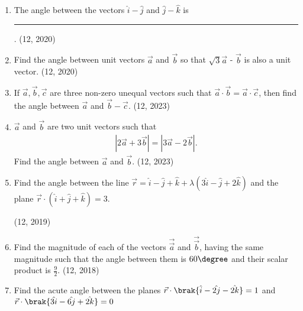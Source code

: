\begin{enumerate}[label=\thesubsection.\arabic*, ref=\thesubsection.\theenumi]
\item The angle between the vectors $\hat{i} - \hat{j}$ and $\hat{j} - \hat{k}$ is \rule{1cm}{0.2pt}.
\hfill (12, 2020)
\item Find the angle between unit vectors $\overrightarrow{a}$ and $\overrightarrow{b}$ so that $\sqrt{3}\overrightarrow{a}$ - $\overrightarrow{b}$ is also a unit vector.
\hfill (12, 2020)
    \item If $\overrightarrow{a}, \overrightarrow{b}, \overrightarrow{c}$ are three non-zero unequal vectors such that $\overrightarrow{a} \cdot \overrightarrow{b} = \overrightarrow{a} \cdot \overrightarrow{c}$, then find the angle between $\overrightarrow{a}$ and $\overrightarrow{b} - \overrightarrow{c}$.
    \hfill (12, 2023)
    \item $\overrightarrow{a}$ and $\overrightarrow{b}$ are two unit vectors such that
    \begin{align}
        \left| 2\overrightarrow{a} + 3\overrightarrow{b} \right| = \left| 3\overrightarrow{a} - 2\overrightarrow{b} \right|.
    \end{align}
  Find the angle between $\overrightarrow{a}$ and $\overrightarrow{b}$.
    \hfill (12, 2023)
	\item Find the angle between the line $\overrightarrow{r} = \hat{i} - \hat{j} + \hat{k} + \lambda (3\hat{i} - \hat{j} + 2\hat{k})$ and the plane $\overrightarrow{r} \cdot (\hat{i} + \hat{j} + \hat{k}) = 3$.

		\hfill (12, 2019)
\item Find the magnitude of each of the vectors $\overrightarrow{\vec{a}}$ and $\overrightarrow{\vec{b}}$, having the same magnitude such that the angle between them is $60\degree$ and their scalar product is $\frac{9}{2}$. \hfill (12, 2018)
\item Find the acute angle between the planes $\vec{r}\cdot\brak{ \hat{i}-\hat{2j}-\hat{2k}}=1$ and $\vec{r}\cdot \brak{\hat{3i}-\hat{6j}+\hat{2k}}=0$


\end{enumerate}
